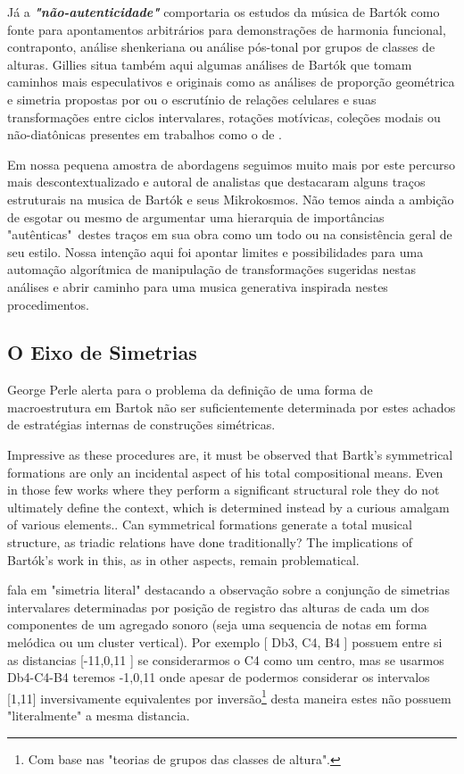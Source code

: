 \documentclass[
	12pt,				%
	openright,			%
	twoside,			%
	a4paper,			%
	english,			%
	french,				%
	spanish,			%
	brazil				%
	]{abntex2}
\begin{document}
Já a \textit{\textbf{"não-autenticidade"}} comportaria os estudos da música de Bartók como fonte para apontamentos arbitrários para demonstrações de harmonia funcional, contraponto, análise shenkeriana ou análise pós-tonal por grupos de classes de alturas. Gillies situa também aqui algumas análises de Bartók que tomam caminhos mais especulativos e originais como as análises de proporção geométrica e simetria propostas por   ou o escrutínio de relações celulares e suas transformações entre ciclos intervalares, rotações motívicas, coleções modais ou não-diatônicas presentes em trabalhos como o de . 

Em nossa pequena amostra de abordagens seguimos muito mais por este percurso mais descontextualizado e autoral de analistas que destacaram alguns traços estruturais na musica de Bartók e seus Mikrokosmos. Não temos ainda a ambição de esgotar ou mesmo de argumentar uma hierarquia de importâncias "autênticas"\ destes traços em sua obra como um todo ou na consistência geral de seu estilo. Nossa intenção aqui foi apontar limites e possibilidades para uma automação algorítmica de manipulação de transformações sugeridas nestas análises e abrir caminho para uma musica generativa inspirada nestes procedimentos.


\subsection{O Eixo de Simetrias}


George Perle alerta para o problema da definição de uma forma de macroestrutura em Bartok não ser suficientemente determinada por estes achados de estratégias internas de construções simétricas.

Impressive as these procedures are, it must be observed that Bartk's symmetrical formations 
are only an incidental aspect of his total compositional means. Even in those few works where they perform a significant structural role they do not ultimately define the context, which is determined
instead by a curious amalgam of various elements..
Can symmetrical formations generate a total musical structure, as triadic relations have done traditionally? The implications of Bartók's work in this, as in other aspects, remain problematical.

 fala em "simetria literal" destacando a observação sobre a conjunção de simetrias intervalares determinadas por posição de registro das alturas de cada um dos componentes de um agregado sonoro (seja uma sequencia de notas em forma melódica ou um cluster vertical). Por exemplo [ Db3, C4, B4 ] possuem entre si as distancias [-11,0,11 ] se considerarmos o C4 como um centro, mas se usarmos {Db4-C4-B4} teremos {-1,0,11} onde apesar de podermos considerar os intervalos [1,11] inversivamente equivalentes por inversão\footnote{Com base nas "teorias de grupos das classes de altura".} desta maneira estes não possuem "literalmente" a mesma distancia.
\end{document}
